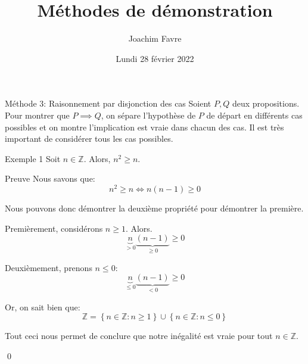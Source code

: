 \documentclass[a4paper]{article}
\title{Méthodes de démonstration}
\author{Joachim Favre}
\date{Lundi 28 février 2022}
\begin{document}
\maketitle


\begin{parag}{Méthode 3: Raisonnement par disjonction des cas}
    Soient $P, Q$ deux propositions. Pour montrer que $P \implies Q$, on sépare l'hypothèse de $P$ de départ en différents cas possibles et on montre l'implication est vraie dans chacun des cas. Il est très important de considérer tous les cas possibles.
\end{parag}

\begin{parag}{Exemple 1}
    Soit $n \in \mathbb{Z}$. Alors, $n^2 \geq n$.

    \begin{subparag}{Preuve}
        Nous savons que: 
        \[n^2 \geq n \iff n\left(n - 1\right) \geq 0\]
        
        Nous pouvons donc démontrer la deuxième propriété pour démontrer la première. 

        Premièrement, considérons $n \geq 1$. Alors. 
        \[\underbrace{n}_{> 0}\underbrace{\left(n - 1\right)}_{\geq 0} \geq 0\]

        Deuxièmement, prenons $n \leq 0$: 
        \[\underbrace{n}_{\leq 0}\underbrace{\left(n-1\right)}_{< 0} \geq 0\]

        Or, on sait bien que:
        \[\mathbb{Z} = \left\{n \in \mathbb{Z} : n \geq 1\right\} \cup \left\{n \in \mathbb{Z} : n \leq 0\right\}\]

        Tout ceci nous permet de conclure que notre inégalité est vraie pour tout $n \in \mathbb{Z}$.

        \qed
    \end{subparag}
\end{parag}
\end{document}
